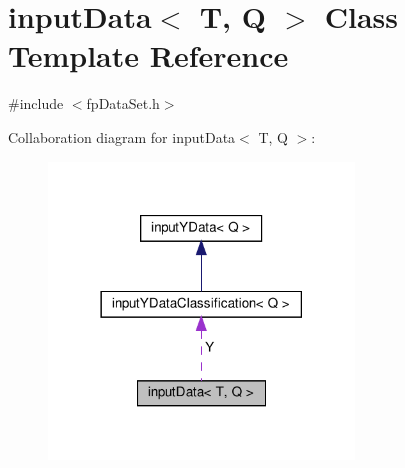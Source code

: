 \hypertarget{classinputData}{}\section{input\+Data$<$ T, Q $>$ Class Template Reference}
\label{classinputData}


{\ttfamily \#include $<$fp\+Data\+Set.\+h$>$}



Collaboration diagram for input\+Data$<$ T, Q $>$\+:\nopagebreak
\begin{figure}[H]
\begin{center}
\leavevmode
\includegraphics[width=230pt]{classinputData__coll__graph}
\end{center}
\end{figure}
